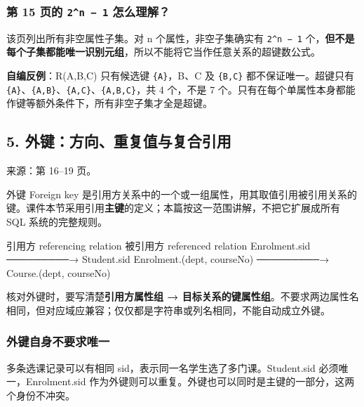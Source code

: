\subsubsection{\texorpdfstring{第 15 页的 \texttt{2\^{}n\ −\ 1} 怎么理解？}{第 15 页的 2\^{}n − 1 怎么理解？}}\label{03_relational_model_and_integrity_zh-ux7b2c-15-ux9875ux7684-2n-1-ux600eux4e48ux7406ux89e3}

该页列出所有非空属性子集。对 n 个属性，非空子集确实有 \texttt{2\^{}n\ −\ 1} 个，\textbf{但不是每个子集都能唯一识别元组}，所以不能将它当作任意关系的超键数公式。

\textbf{自编反例}：R(A,B,C) 只有候选键 \texttt{\{A\}}，B、C 及 \texttt{\{B,C\}} 都不保证唯一。超键只有 \texttt{\{A\}}、\texttt{\{A,B\}}、\texttt{\{A,C\}}、\texttt{\{A,B,C\}}，共 4 个，不是 7 个。只有在每个单属性本身都能作键等额外条件下，所有非空子集才全是超键。

\Needspace{11cm}
\subsection{5. 外键：方向、重复值与复合引用}\label{03_relational_model_and_integrity_zh-ux5916ux952eux65b9ux5411ux91cdux590dux503cux4e0eux590dux5408ux5f15ux7528}


来源：第 16--19 页。

外键 Foreign key 是引用方关系中的一个或一组属性，用其取值引用被引用关系的键。课件本节采用引用\textbf{主键}的定义；本篇按这一范围讲解，不把它扩展成所有 SQL 系统的完整规则。

\begin{StudyCode}
引用方 referencing relation                 被引用方 referenced relation
Enrolment.sid                  ─────────→   Student.sid
Enrolment.(dept, courseNo)      ─────────→   Course.(dept, courseNo)
\end{StudyCode}

核对外键时，要写清楚\textbf{引用方属性组 → 目标关系的键属性组}。不要求两边属性名相同，但对应域应兼容；仅仅都是字符串或列名相同，不能自动成立外键。

\subsubsection{外键自身不要求唯一}\label{03_relational_model_and_integrity_zh-ux5916ux952eux81eaux8eabux4e0dux8981ux6c42ux552fux4e00}

多条选课记录可以有相同 sid，表示同一名学生选了多门课。Student.sid 必须唯一，Enrolment.sid 作为外键则可以重复。外键也可以同时是主键的一部分，这两个身份不冲突。

